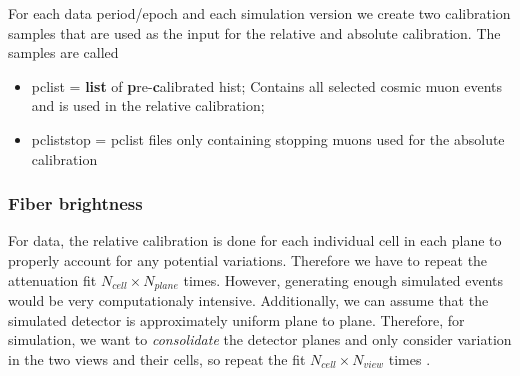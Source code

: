 \documentclass[12pt,a4paper]{article}
\begin{document}

For each data period/epoch and each simulation version we create two calibration samples that are used as the input for the relative and absolute calibration. The samples are called \cite{NOVA-doc-13579-CalibrationMetaREADFIRST}
\begin{itemize}
\item pclist = \textbf{list} of \textbf{p}re-\textbf{c}alibrated hist; Contains all selected cosmic muon events and is used in the relative calibration;
\item pcliststop = pclist files only containing stopping muons used for the absolute calibration 
\end{itemize}

\subsubsection*{Fiber brightness}

For data, the relative calibration is done for each individual cell in each plane to properly account for any potential variations. Therefore we have to repeat the attenuation fit $N_{cell}\times N_{plane}$ times. However, generating enough simulated events would be very computationaly intensive. Additionally, we can assume that the simulated detector is approximately uniform plane to plane. Therefore, for simulation, we want to \textit{consolidate} the detector planes and only consider variation in the two views and their cells, so repeat the fit $N_{cell}\times N_{view}$ times \cite{NOVA-doc-13579-SAAttenuationAndThreshold,NOVA-doc-34909}.
\end{document}
